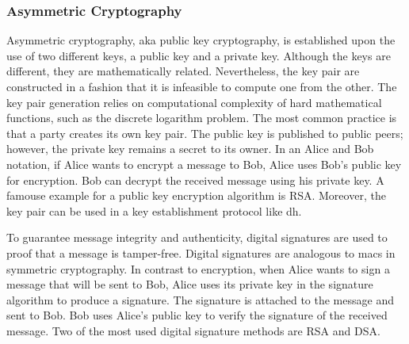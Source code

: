 \subsubsection{Asymmetric Cryptography}
Asymmetric cryptography, aka public key cryptography, is established upon the use of two different keys, a public key and a private key. Although the keys are different, they are mathematically related. Nevertheless, the key pair are constructed in a fashion that it is infeasible to compute one from the other. The key pair generation relies on computational complexity of hard mathematical functions, such as the discrete logarithm problem. The most common practice is that a party creates its own key pair. The public key is published to public peers; however, the private key remains a secret to its owner. In an Alice and Bob notation, if Alice wants to encrypt a message to Bob, Alice uses Bob's public key for encryption. Bob can decrypt the received message using his private key. A famouse example for a public key encryption algorithm is RSA. Moreover, the key pair can be used in a key establishment protocol like \gls{dh}.
\par
To guarantee message integrity and authenticity, digital signatures are used to proof that a message is tamper-free. Digital signatures are analogous to \glspl{mac} in symmetric cryptography. In contrast to encryption, when Alice wants to sign a message that will be sent to Bob, Alice uses its private key in the signature algorithm to produce a signature. The signature is attached to the message and sent to Bob. Bob uses Alice's public key to verify the signature of the received message. Two of the most used digital signature methods are RSA and DSA.